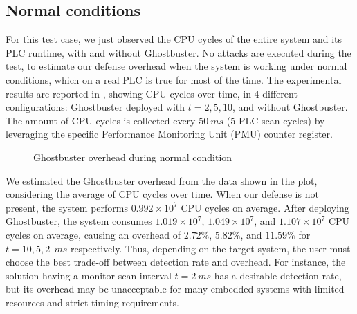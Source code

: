 \subsection{Normal conditions}

For this test case, we just observed the CPU cycles of the entire system and its PLC runtime, with and without Ghostbuster.
No attacks are executed during the test, to estimate our defense overhead when the system is working under normal conditions,
which on a real PLC is true for most of the time.
The experimental results are reported in , showing CPU cycles over time, in $4$ different configurations:
Ghostbuster deployed with $t=2,5,10$, and without Ghostbuster. The amount of CPU cycles is collected every $\SI{50}{ms}$ ($5$ PLC scan cycles)
by leveraging the specific Performance Monitoring Unit (PMU) counter register.

\begin{figure}[h]
\centering
{}
\caption{Ghostbuster overhead during normal condition}
\label{fig:normal-overhead}
\end{figure}

We estimated the Ghostbuster overhead from the data shown in the plot, considering the average of CPU cycles over time.
When our defense is not present, the system performs $0.992 \times 10^{7}$ CPU cycles on average.
After deploying Ghostbuster, the system consumes $1.019 \times 10^{7}$, $1.049 \times 10^{7}$, and $1.107 \times 10^{7}$ CPU cycles on average,
causing an overhead of $2.72\%$, $5.82\%$, and $11.59\%$ for $t = 10,5,2~\SI{}{ms}$ respectively.
Thus, depending on the target system, the user must choose the best trade-off between detection rate and overhead.
For instance, the solution having a monitor scan interval $t = \SI{2}{ms}$ has a desirable detection rate, but its overhead may be unacceptable for many embedded systems
with limited resources and strict timing requirements.


